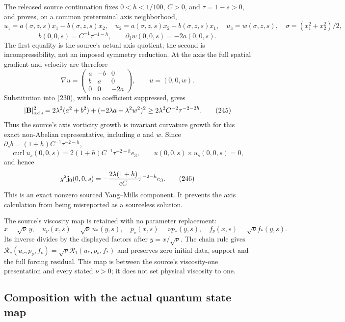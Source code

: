 \documentclass[11pt]{article}
\begin{document}
The released source continuation fixes \(0<h<1/100\), \(C>0\), and
\(\tau=1-s>0\), and proves, on a common preterminal axis neighborhood,
\[
 u_1=a(\sigma,z,s)x_1-b(\sigma,z,s)x_2,\quad
 u_2=a(\sigma,z,s)x_2+b(\sigma,z,s)x_1,\quad
 u_3=w(\sigma,z,s),\quad \sigma=(x_1^2+x_2^2)/2,
\tag{242}
\]
\[
 b(0,0,s)=C^{-1}\tau^{-1-h},\qquad
 \partial_3w(0,0,s)=-2a(0,0,s).
\tag{243}
\]
The first equality is the source's actual axis quotient; the second is
incompressibility, not an imposed symmetry reduction. At the axis the
full spatial gradient and velocity are therefore
\[
 \nabla u=\begin{pmatrix}a&-b&0\\ b&a&0\\0&0&-2a\end{pmatrix},
 \qquad u=(0,0,w).
\tag{244}
\]
Substitution into (230), with no coefficient suppressed, gives
\[
 |{\bf B}|^2_{\rm axis}
 =2\lambda^2(a^2+b^2)+(-2\lambda a+\lambda^2w^2)^2
 \ge 2\lambda^2C^{-2}\tau^{-2-2h}.
\tag{245}
\]
Thus the source's axis vorticity growth is invariant curvature growth for
this exact non-Abelian representative, including \(a\) and \(w\). Since
\(\partial_s b=(1+h)C^{-1}\tau^{-2-h}\),
\[
 \operatorname{curl}u_s(0,0,s)=
 2(1+h)C^{-1}\tau^{-2-h}e_3,\qquad
 u(0,0,s)\times u_s(0,0,s)=0,
\]
and hence
\[
 g^2{\bf j}_0(0,0,s)
 =-\frac{2\lambda(1+h)}{cC}\tau^{-2-h}e_3.
\tag{246}
\]
This is an exact nonzero sourced Yang--Mills component. It prevents the
axis calculation from being misreported as a sourceless solution.

The source's viscosity map is retained with no parameter replacement:
\[
 x=\sqrt{\nu}\,y,\quad
 u_\nu(x,s)=\sqrt{\nu}\,u_*(y,s),\quad
 p_\nu(x,s)=\nu p_*(y,s),\quad f_\nu(x,s)=\sqrt{\nu}f_*(y,s).
\tag{247}
\]
Its inverse divides by the displayed factors after \(y=x/\sqrt{\nu}\).
The chain rule gives
\(\mathcal R_\nu(u_\nu,p_\nu,f_\nu)=
\sqrt{\nu}\mathcal R_1(u_*,p_*,f_*)\) and preserves zero initial data,
support and the full forcing residual. This map is between the source's
viscosity-one presentation and every stated \(\nu>0\); it does not set
physical viscosity to one.

\subsection{Composition with the actual quantum state map}
\end{document}
